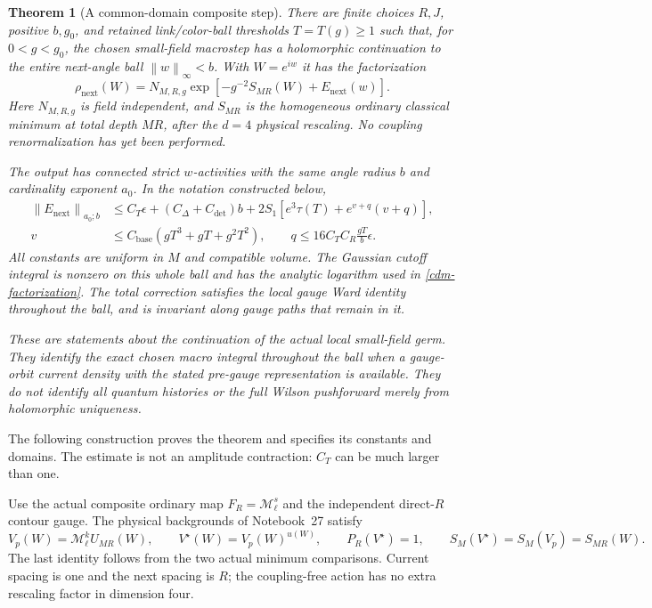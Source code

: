 \documentclass[11pt]{article}
\newtheorem{theorem}{Theorem}[section]
\theoremstyle{remark}
\newcommand{\norm}[1]{\left\|#1\right\|}
\begin{document}
\begin{theorem}[A common-domain composite step]
\label{cdm-theorem}
There are finite choices $R,J$, positive $b,g_0$, and retained
link/color-ball thresholds $T=T(g)\ge1$ such that, for
$0<g<g_0$, the chosen small-field macrostep has a holomorphic
continuation to the entire next-angle ball $\norm{w}_\infty<b$.
With $W=e^{iw}$ it has the factorization
\begin{equation}
 \rho_{\mathrm{next}}(W)=
 N_{M,R,g}\exp\left[-g^{-2}S_{MR}(W)+E_{\mathrm{next}}(w)\right].
 \label{cdm-factorization}
\end{equation}
Here $N_{M,R,g}$ is field independent, and $S_{MR}$ is the
homogeneous ordinary classical minimum at total depth $MR$,
after the $d=4$ physical rescaling. No coupling renormalization
has yet been performed.

The output has connected strict $w$-activities with the same
angle radius $b$ and cardinality exponent $a_0$. In the notation
constructed below,
\begin{align}
 \norm{E_{\mathrm{next}}}_{a_0;b}
 &\le C_T\epsilon+(C_\Delta+C_{\det})b
       +2S_1\left[e^3\tau(T)+e^{v+q}(v+q)\right],
 \label{cdm-output-bound}\\
 v&\le C_{\mathrm{base}}(gT^3+gT+g^2T^2),\qquad
 q\le16C_TC_R\frac{gT}{b}\epsilon .
 \label{cdm-small-factors}
\end{align}
All constants are uniform in $M$ and compatible volume. The
Gaussian cutoff integral is nonzero on this whole ball and has
the analytic logarithm used in \eqref{cdm-factorization}.
The total correction satisfies the local gauge Ward identity
throughout the ball, and is invariant along gauge paths that
remain in it.

These are statements about the continuation of the actual local
small-field germ. They identify the exact chosen macro integral
throughout the ball when a gauge-orbit current density with the
stated pre-gauge representation is available. They do not identify
all quantum histories or the full Wilson pushforward merely from
holomorphic uniqueness.
\end{theorem}

The following construction proves the theorem and specifies its
constants and domains. The estimate is not an amplitude
contraction: $C_T$ can be much larger than one.

Use the actual composite ordinary map
$F_R=\mathcal M_\ell^s$ and the independent direct-$R$ contour
gauge. The physical backgrounds of Notebook~27 satisfy
\begin{equation}
 V_p(W)=\mathcal M_\ell^k U_{MR}(W),\qquad
 V^\star(W)=V_p(W)^{u(W)},\qquad P_R(V^\star)=1,
 \qquad S_M(V^\star)=S_M(V_p)=S_{MR}(W).
 \label{cdm-background}
\end{equation}
The last identity follows from the two actual minimum comparisons.
Current spacing is one and the next spacing is $R$; the
coupling-free action has no extra rescaling factor in dimension
four.
\end{document}
